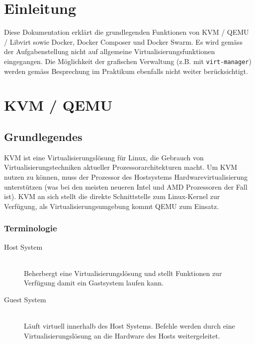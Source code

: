 

\newcommand{\SUBJECT}{Report}
\newcommand{\TITLE}{Cloud Infrastructre Lab 4}











\section*{Einleitung}
Diese Dokumentation erklärt die grundlegenden Funktionen von KVM / QEMU / Libvirt sowie Docker, Docker Composer und Docker Swarm. Es wird gemäss der Aufgabenstellung nicht auf allgemeine Virtualisierungsfunktionen eingegangen. Die Möglichkeit der grafischen Verwaltung (z.B. mit \lstinline|virt-manager|) werden gemäss Besprechung im Praktikum ebenfalls nicht weiter berücksichtigt.


\section{KVM / QEMU}
\subsection{Grundlegendes}
KVM ist eine Virtualisierungslösung für Linux, die Gebrauch von Virtualisierungstechniken aktueller Prozessorarchitekturen macht. Um KVM nutzen zu können, muss der Prozessor des Hostsystems Hardwarevirtualisierung unterstützen (was bei den meisten neueren Intel und AMD Prozessoren der Fall ist). KVM an sich stellt die direkte Schnittstelle zum Linux-Kernel zur Verfügung, als Virtualisierungsumgebung kommt QEMU zum Einsatz.

\subsubsection{Terminologie}
\begin{description}
	\item[Host System] \hfill \\
	Beherbergt eine Virtualisierungslösung und stellt Funktionen zur Verfügung damit ein Gastsystem laufen kann.
	\item[Guest System] \hfill \\
	Läuft virtuell innerhalb des Host Systems. Befehle werden durch eine Virtualisierungslösung an die Hardware des Hosts weitergeleitet.
\end{description}

